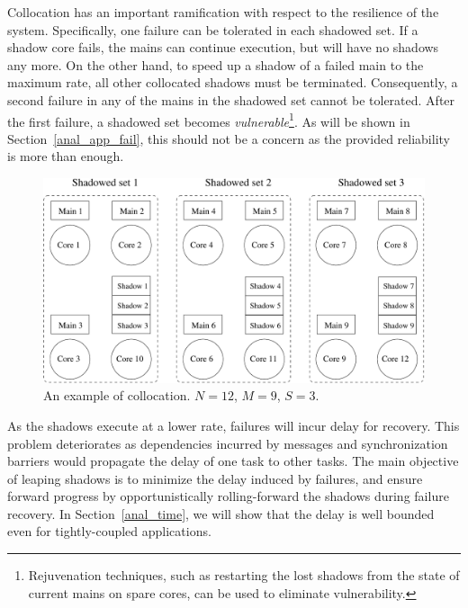 Collocation has an important ramification with respect to the resilience of the system. Specifically, 
one failure can be tolerated in each shadowed set. If a shadow core fails, the mains can continue
execution, but will have no shadows any more. On the other hand, 
to speed up a shadow 
of a failed main to the maximum rate, all other collocated shadows must be terminated. Consequently, a second failure in any of the mains in the shadowed set cannot be tolerated. After the first failure, a shadowed set becomes \emph{vulnerable}\footnote{Rejuvenation techniques, such as restarting the lost shadows from the state of current mains on spare cores, can be used to eliminate vulnerability.}. 
As will be shown in Section~\ref{anal_app_fail}, this should not be a concern as the provided reliability is more than enough.
 
\begin{figure}[!t]
  \begin{center}
    \includegraphics[width=\columnwidth]{Figures/sc_mapping.pdf}
  \end{center}
  \caption{An example of collocation. $N=12$, $M=9$, $S=3$.}
  \label{fig:sc_mapping}
\end{figure}

As the shadows execute at a lower rate, failures will incur delay for recovery. This problem deteriorates as dependencies incurred by messages and synchronization barriers would propagate the delay of one task to other tasks.  
The main objective of leaping shadows is to minimize the delay induced by failures, 
and ensure forward progress by opportunistically rolling-forward the shadows during failure recovery. In Section~\ref{anal_time}, we will show that the delay is well bounded even for tightly-coupled applications.


